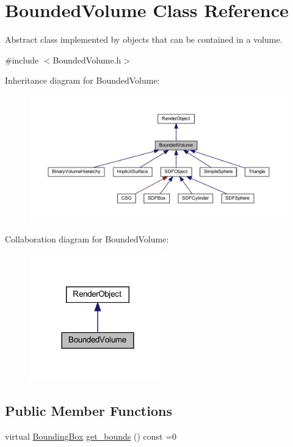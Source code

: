 \hypertarget{classBoundedVolume}{}\section{Bounded\+Volume Class Reference}
\label{classBoundedVolume}


Abstract class implemented by objects that can be contained in a volume.  




{\ttfamily \#include $<$Bounded\+Volume.\+h$>$}



Inheritance diagram for Bounded\+Volume\+:
\nopagebreak
\begin{figure}[H]
\begin{center}
\leavevmode
\includegraphics[width=350pt]{classBoundedVolume__inherit__graph}
\end{center}
\end{figure}


Collaboration diagram for Bounded\+Volume\+:
\nopagebreak
\begin{figure}[H]
\begin{center}
\leavevmode
\includegraphics[width=168pt]{classBoundedVolume__coll__graph}
\end{center}
\end{figure}
\subsection*{Public Member Functions}
\begin{DoxyCompactItemize}
\item 
virtual \mbox{\hyperlink{classBoundingBox}{Bounding\+Box}} \mbox{\hyperlink{classBoundedVolume_a281168c4d827c38b46e639f6e4991a9e}{get\+\_\+bounds}} () const =0
\end{DoxyCompactItemize}



